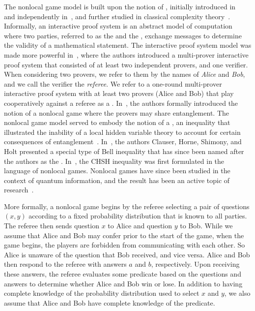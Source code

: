 The nonlocal game model is built upon the notion of , initially introduced in~\cite{Goldwasser1985} and independently in~\cite{Babai1985}, and further studied in classical complexity theory~\cite{Ben-Or1988,Fortnow1989,Babai1991,Feige1991,Feige1994,Raz1998}. Informally, an interactive proof system is an abstract model of computation where two parties, referred to as the  and the , exchange messages to determine the validity of a mathematical statement. The interactive proof system model was made more powerful in~\cite{Ben-Or1988}, where the authors introduced a multi-prover interactive proof system that consisted of at least two independent provers, and one verifier. When considering two provers, we refer to them by the names of \emph{Alice} and \emph{Bob}, and we call the verifier the \emph{referee}. We refer to a one-round multi-prover interactive proof system with at least two provers (Alice and Bob) that play cooperatively against a referee as a . In~\cite{Cleve2004}, the authors formally introduced the notion of a nonlocal game where the provers may share entanglement. The nonlocal game model served to embody the notion of a , an inequality that illustrated the inability of a local hidden variable theory to account for certain consequences of entanglement~\cite{Bell1964}. In~\cite{Clauser1969}, the authors Clauser, Horne, Shimony, and Holt presented a special type of Bell inequality that has since been named after the authors as the . In~\cite{Cleve2004}, the CHSH inequality was first formulated in the language of nonlocal games. Nonlocal games have since been studied in the context of quantum information, and the result has been an active topic of research~\cite{Cleve2004, Brassard2005, Cleve2008, Doherty2008,Kempe2010,Kempe2010a,Kempe2011,Junge2011a,Buhrman2013,
Regev2013,Dinur2013,Vidick2013,Cleve2014}.



More formally, a nonlocal game begins by the referee selecting a pair of questions $(x,y)$ according to a fixed probability distribution that is known to all parties. The referee then sends question $x$ to Alice and question $y$ to Bob. While we assume that Alice and Bob may confer prior to the start of the game, when the game begins, the players are forbidden from communicating with each other. So Alice is unaware of the question that Bob received, and vice versa. Alice and Bob then respond to the referee with answers $a$ and $b$, respectively. Upon receiving these answers, the referee evaluates some predicate based on the questions and answers to determine whether Alice and Bob win or lose. In addition to having complete knowledge of the probability distribution used to select $x$ and $y$, we also assume that Alice and Bob have complete knowledge of the predicate.


